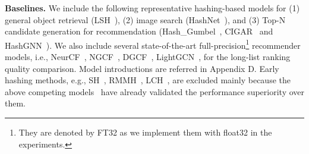 \textbf{Baselines.}
\label{sec:baseline}
We include the following representative hashing-based models for (1) general object retrieval (LSH~\cite{lsh}), (2) image search (HashNet~\cite{hashnet}), and (3) Top-N candidate generation for recommendation (Hash\_Gumbel~\cite{gumbel1,gumbel2}, CIGAR~\cite{kang2019candidate} and HashGNN~\cite{hashgnn}).
We also include several state-of-the-art full-precision\footnote{They are denoted by FT32 as we implement them with float32 in the experiments.} recommender models, i.e., NeurCF~\cite{neurcf}, NGCF~\cite{ngcf}, DGCF~\cite{dgcf}, LightGCN~\cite{lightgcn}, for the long-list ranking quality comparison.
Model introductions are referred in Appendix D.
Early hashing methods, e.g., SH~\cite{weiss2008spectral}, RMMH~\cite{joly2011random}, LCH~\cite{zhang2010laplacian}, are excluded mainly because the above competing models~\cite{hashnet,kang2019candidate} have already validated the performance superiority over them. 


